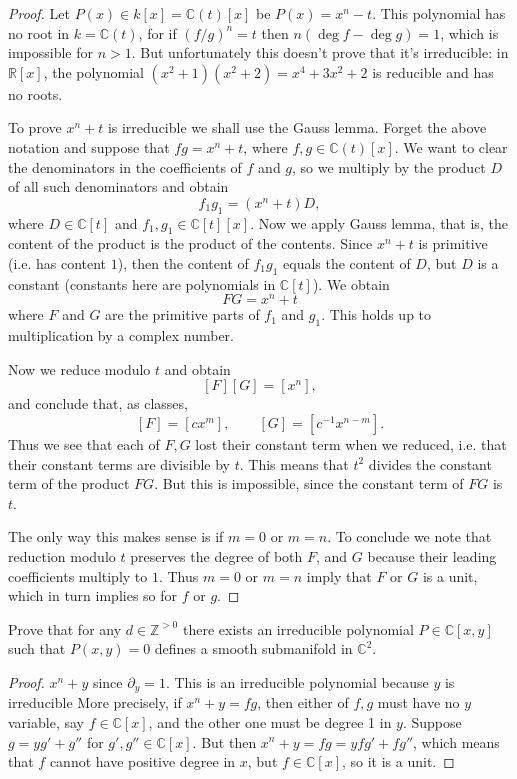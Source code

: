 \begin{proof}
Let $P(x) \in k[x]=\mathbb{C}(t)[x]$
be $P(x) = x^n-t$.
This polynomial has no root in
$k=\mathbb{C}(t)$,
for if $(f/g)^n=t$ then 
$n(\operatorname{deg}f-
\operatorname{deg}g)=1$,
which is impossible for $n>1$.
But unfortunately this doesn't prove
that it's irreducible: in $\mathbb{R}[x]$,
the polynomial
$(x^2 + 1)(x^2+2)=x^4+3x^2+2$
is reducible and has no roots.

To prove $x^n + t$ is irreducible we shall
use the Gauss lemma. Forget the above
notation and suppose that
$fg = x^n + t$, where
$f,g \in \mathbb{C}(t)[x]$.
We want to clear the denominators in
the coefficients of $f$ and $g$,
so we multiply by the product $D$ of all
such denominators and obtain
$$
f_1g_1 = (x^n + t)D,
$$
where $D \in \mathbb{C}[t]$ and
$f_1,g_1 \in \mathbb{C}[t][x]$.
Now we apply Gauss lemma, that is, the
content of the product is the product
of the contents. Since $x^n +t$ is primitive
(i.e. has content $1$), then the
content of $f_1g_1$ equals the content
of $D$, but $D$ is a constant
(constants here are polynomials in
$\mathbb{C}[t]$).
We obtain
$$
FG = x^n + t
$$
where $F$ and $G$ are the primitive parts
of $f_1$ and $g_1$. This holds up to
multiplication by a complex number.

Now we reduce modulo $t$ and obtain
$$
[F][G] = [x^n],
$$
and conclude that, as classes,
$$
[F]=[cx^m],\qquad 
[G]=[c^{-1}x^{n-m}].
$$
Thus we see that each of $F,G$
lost their constant term when we reduced,
i.e. that their constant terms are divisible
by $t$. This means that $t^2$ divides
the constant term of the product $FG$.
But this is impossible, since the constant
term of $FG$ is $t$. 

The only way
this makes sense is if $m=0$ or $m=n$.
To conclude we note that reduction modulo
$t$ preserves the degree of both $F$, and 
$G$ because their leading coefficients
multiply to $1$. Thus $m=0$ or $m=n$
imply that $F$ or $G$ is a unit, which
in turn implies so for $f$ or $g$.
\end{proof}

\begin{exercise}
\label{exercise-smooth-irreducible-plane}
Prove that for any $d \in  \mathbb{Z}^{>0}$
there exists an irreducible polynomial
$P \in \mathbb{C}[x,y]$ such that
$P(x,y)=0$ defines a smooth submanifold
in $\mathbb{C}^2$.
\end{exercise}

\begin{proof}
$x^n+y$ since $\partial_y =1$.
This is an irreducible polynomial
because $y$ is irreducible
More precisely,
if $x^n+y = fg$, then either of $f,g$
must have no $y$ variable, say $f \in
\mathbb{C}[x]$,
and the other one must be degree 1 in $y$.
Suppose $g = y g' + g''$ for $g',g'' \in
\mathbb{C}[x]$. But then
$x^n+y = fg = yfg' + f g''$,
which means that $f$ cannot have positive
degree in $x$, but $f \in \mathbb{C}[x]$,
so it is a unit.
\end{proof}

